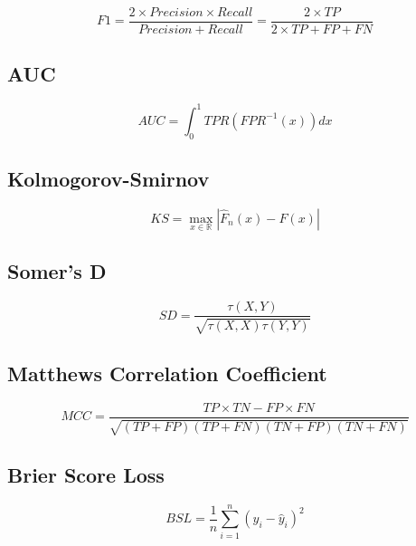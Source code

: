 \begin{equation}\label{eq}
    F1 = \frac{2 \times Precision \times Recall}{Precision + Recall} = \frac{2 \times TP}{2 \times TP + FP + FN}
\end{equation}

\subsection{AUC}

\begin{equation}\label{eq}
    AUC = \int_{0}^{1} TPR \left(FPR^{-1}\left(x \right)\right) dx
\end{equation}

\subsection{Kolmogorov-Smirnov}

\begin{equation}\label{eq}
    KS = \max_{x \in \mathbb{R}} \left| \hat{F}_n \left(x \right) - F \left(x \right) \right|
\end{equation}


\subsection{Somer's D}

\begin{equation}\label{eq}
    SD = \frac{\tau \left(X, Y\right)}{\sqrt{\tau \left(X, X\right) \tau \left(Y, Y\right)}}
\end{equation}


\subsection{Matthews Correlation Coefficient}

\begin{equation}\label{eq}
    MCC = \frac{TP \times TN - FP \times FN}{\sqrt{(TP + FP) (TP + FN) (TN + FP) (TN + FN)}}
\end{equation}


\subsection{Brier Score Loss}

\begin{equation}\label{eq}
    BSL = \frac{1}{n} \sum_{i=1}^{n} (y_i - \hat{y}_i)^2
\end{equation}


